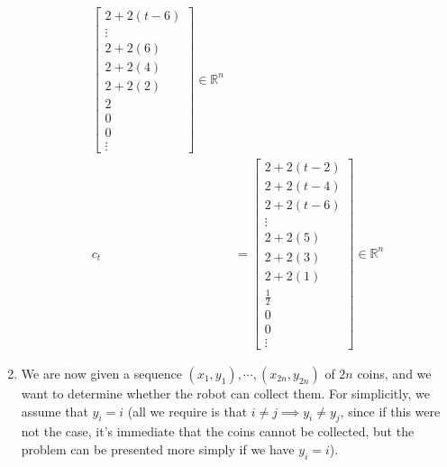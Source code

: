 \documentclass[12pt]{exam}
\begin{document}
\begin{questions}
\begin{solution}
\begin{enumerate}[label=(\alph*)]
\begin{align*}
\begin{bmatrix}
          2 + 2(t - 6) \\
          \vdots \\
          2 + 2(6) \\
          2 + 2(4) \\
          2 + 2(2) \\
          2 \\
          0 \\
          0 \\
          \vdots
        \end{bmatrix} \in \mathbb{R}^n \tag{$t$ is even} \\
        c_t &=
        \begin{bmatrix}
          2 + 2(t -2) \\
          2 + 2(t - 4) \\
          2 + 2(t - 6) \\
          \vdots \\
          2 + 2(5) \\
          2 + 2(3) \\
          2 + 2(1) \\
          \frac{1}{2} \\
          0 \\
          0 \\
          \vdots
        \end{bmatrix} \in \mathbb{R}^n \tag{$t$ is odd} 
    \end{align*}
      \item 
        We are now given a sequence $(x_1, y_1), \cdots, (x_{2n}, y_{2n})$ of $2n$ coins, and we want to determine whether the robot can collect them. For simplicitly, we assume that $y_i = i$ (all we require is that $i \neq j \implies y_i \neq y_j$, since if this were not the case, it's immediate that the coins cannot be collected, but the problem can be presented more simply if we have $y_i = i$).


\end{enumerate}
\end{solution}
\end{questions}
\end{document}
